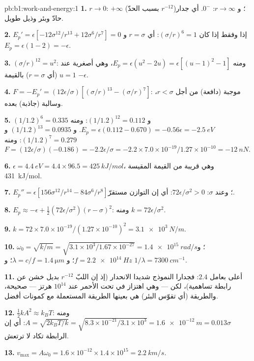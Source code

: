 \begin{solution}{pb:b1:work-and-energy:1}
\textbf{1.} $r \to 0$: $+\infty$ (بسبب الحدّ $r^{-12}$)؛ و $r \to \infty$:
$0^-$. أي جدار حادّ وبئر وذيل طويل.

\textbf{2.} $E_p' = \epsilon[-12\sigma^{12}/r^{13} + 12\sigma^6/r^7] = 0$ إذا وفقط إذا كان
$(\sigma/r)^6 = 1$: أي $r = \sigma$ و $E_p = \epsilon(1 - 2) = -\epsilon$.

\textbf{3.} $(\sigma/r)^{12} = u^2$: ومنه $E_p = \epsilon(u^2 - 2u) = \epsilon[(u - 1)^2
- 1]$، وهي أصغرية عند $u = 1$ (أي $r = \sigma$) بالقيمة $-\epsilon$.

\textbf{4.} $F = -E_p' = (12\epsilon/\sigma)[(\sigma/r)^{13} - (\sigma/r)^7]$:
موجبة (دافعة) من أجل $r < \sigma$، وسالبة (جاذبة) بعده.

\textbf{5.} $(1/1.2)^6 = 0.335$ و $(1/1.2)^{12} = 0.112$: ومنه $E_p = \epsilon(0.112
- 0.670) = -0.56\epsilon = \qty{-2.5}{eV}$. و $(1/1.2)^{13} = 0.0935$ و
$(1/1.2)^7 = 0.279$: ومنه $F = (12\epsilon/\sigma)(-0.186) = -2.2\epsilon/\sigma =
-2.2 \times 7.0\times10^{-19}/1.27\times10^{-10} = \qty{-12}{nN}$.

\textbf{6.} $\epsilon = \qty{4.4}{eV} = 4.4 \times 96.5 = \qty{425}{kJ/mol}$،
وهي قريبة من القيمة المقيسة \qty{431}{kJ/mol}.

\textbf{7.} $E_p'' = \epsilon[156\sigma^{12}/r^{14} - 84\sigma^6/r^8]$؛ وعند
$\sigma$: $72\epsilon/\sigma^2 > 0$: أي إن التوازن مستقرّ.

\textbf{8.} $E_p \approx -\epsilon + \tfrac12(72\epsilon/\sigma^2)(r - \sigma)^2$: ومنه
$k = 72\epsilon/\sigma^2$.

\textbf{9.} $k = 72 \times 7.0\times10^{-19}/(1.27\times10^{-10})^2 =
\qty{3.1e3}{N/m}$.

\textbf{10.} $\omega_0 = \sqrt{k/m} = \sqrt{3.1\times10^3/1.67\times10^{-27}} =
\qty{1.4e15}{rad/s}$؛ و $f = \qty{2.2e14}{Hz}$؛ و $\lambda = c/f = \qty{1.4}{\micro m}$؛
و $1/\lambda = \qty{7300}{cm^{-1}}$.

\textbf{11.} أعلى بعامل $2.4$: فجدارا النموذج شديدا الانحدار
(إذ إن اللبّ $r^{-12}$ بديل خشن عن رابطة تساهمية)، لكن
 --- وهي اهتزاز في تحت الأحمر عند $10^{14}$ هرتز --- صحيحة،
والطريقة (أي تقوّس البئر) هي بعينها الطريقة المستعملة
مع كمونات أفضل.

\textbf{12.} $\tfrac12 kA^2 \approx k_BT$: ومنه $A = \sqrt{2k_BT/k} = \sqrt{8.3\times
10^{-21}/3.1\times10^3} = \qty{1.6e-12}{m} = 0.013\sigma$: أي إن الرابطة
تكاد لا ترتعش.

\textbf{13.} $v_{\max} = A\omega_0 = 1.6\times10^{-12} \times 1.4\times10^{15}
= \qty{2.2}{km/s}$.


\end{solution}
